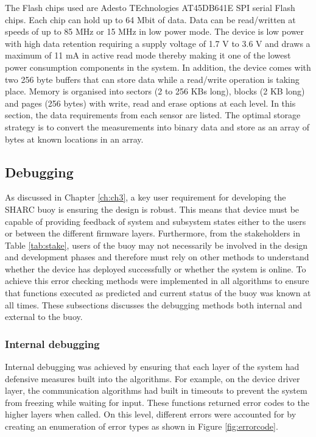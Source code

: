 The Flash chips used are Adesto TEchnologies AT45DB641E SPI serial Flash chips. Each chip can hold up to 64 Mbit of data. Data can be read/written at speeds of up to 85 MHz or 15 MHz in low power mode. The device is low power with high data retention requiring a supply voltage of 1.7 V to 3.6 V and draws a maximum of 11 mA in active read mode thereby making it one of the lowest power consumption components in the system. In addition, the device comes with two 256 byte buffers that can store data while a read/write operation is taking place. Memory is organised into sectors (2 to 256 KBs long), blocks (2 KB long) and pages (256 bytes) with write, read and erase options at each level. In this section, the data requirements from each sensor are listed. The optimal storage strategy is to convert the measurements into binary data and store as an array of bytes at known locations in an array. \par 

\subsection{Debugging}

As discussed in Chapter \ref{ch:ch3}, a key user requirement for developing the SHARC buoy is ensuring the design is robust. This means that device must be capable of providing feedback of system and subsystem states either to the users or between the different firmware layers. Furthermore, from the stakeholders in Table \ref{tab:stake}, users of the buoy may not necessarily be involved in the design and development phases and therefore must rely on other methods to understand whether the device has deployed successfully or whether the system is online. To achieve this error checking methods were implemented in all algorithms to ensure that functions executed as predicted and current status of the buoy was known at all times. These subsections discusses the debugging methods both internal and external to the buoy.

\subsubsection{Internal debugging}

Internal debugging was achieved by ensuring that each layer of the system had defensive measures built into the algorithms. For example, on the device driver layer, the communication algorithms had built in timeouts to prevent the system from freezing while waiting for input. These functions returned error codes to the higher layers when called. On this level, different errors were accounted for by creating an enumeration of error types as shown in Figure \ref{fig:errorcode}.

